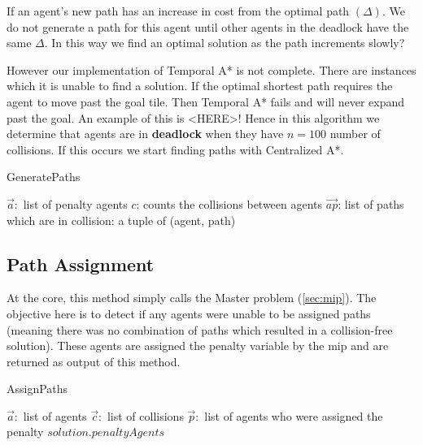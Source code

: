 \documentclass[a4paper,11pt]{article}
\let\oldReturn\Return
\renewcommand{\Return}{\State\oldReturn}
\begin{document}
If an agent's new path has an increase in cost from the optimal path $(\Delta)$. We do not generate a path for this agent until other agents in the deadlock have the same $\Delta$. In this way we find an optimal solution as the path increments slowly?

However our implementation of Temporal A* is not complete. There are instances which it is unable to find a solution. If the optimal shortest path requires the agent to move past the goal tile. Then Temporal A* fails and will never expand past the goal. An example of this is <HERE>! Hence in this algorithm we determine that agents are in \textbf{deadlock} when they have $n=100$ number of collisions. If this occurs we start finding paths with Centralized A*. 

\begin{algorithm}[H]
	\caption{GeneratePaths}\label{alg_GeneratePaths}
	\begin{algorithmic}[1]
		\Require $\vec{a}:$ list of penalty agents $c$: counts the collisions between agents
		\Ensure $\vec{ap}$: list of paths which are in collision: a tuple of (agent, path)
			\Else
			\EndIf
		\EndFor
	\end{algorithmic}
\end{algorithm}

\subsection{Path Assignment}

At the core, this method simply calls the Master problem (\ref{sec:mip}). The objective here is to detect if any agents were unable to be assigned paths (meaning there was no combination of paths which resulted in a collision-free solution). These agents are assigned the penalty variable by the mip and are returned as output of this method.

\begin{algorithm}
	\caption{AssignPaths}\label{alg_AssignPaths}
	\begin{algorithmic}[1]
		\Require $\vec{a}:$ list of agents $\vec{c}:$ list of collisions
		\Ensure $\vec{p}:$ list of agents who were assigned the penalty
		\EndFor 
		\Return $solution.penaltyAgents$
	\end{algorithmic}
\end{algorithm}
\end{document}
